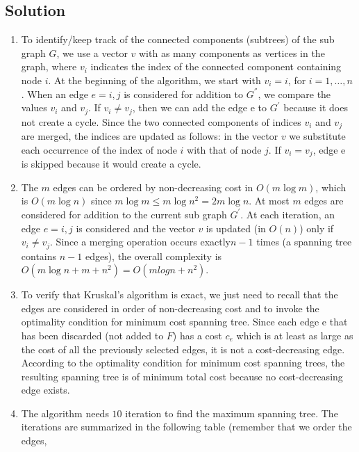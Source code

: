 \documentclass[12pt, a4paper]{report}
\newtheorem[style=M,bodystyle=\normalfont]{theorem}{Theorem}
\newtheorem[style=M,bodystyle=\normalfont]{corollary}{Corollary}
\newtheorem[style=M,bodystyle=\normalfont]{lemma}{Lemma}
\newtheorem[style=M,bodystyle=\normalfont]{definition}{Definition}
\begin{document}
    \subsection*{Solution}
        \begin{enumerate}
            \item To identify/keep track of the connected components (subtrees) of the sub graph $G$, we use a vector $v$ with as many components as vertices in the graph, 
                where $v_i$ indicates the index of the connected component containing node $i$. At the beginning of the algorithm, we start with $v_i=i$, for $i = 1,\dots,n$. 
                When an edge $e = {i,j}$ is considered for addition to $G^{''}$, we compare the values $v_i$ and $v_j$. If $v_i \neq v_j$, then we can add the edge e to $G^{'}$ 
                because it does not create a cycle. Since the two connected components of indices $v_i$ and $v_j$ are merged, the indices are updated as follows: in the vector $v$
                we substitute each occurrence of the index of node $i$ with that of node $j$. If $v_i = v_j$, edge e is skipped because it would create a cycle. 
            \item The $m$ edges can be ordered by non-decreasing cost in $O(m\log m)$, which is $O(m \log n)$ since $m\log m \leq m\log n^2 = 2m\log n$. At most $m$ edges are 
                considered for addition to the current sub graph $G^{'}$. At each iteration, an edge $e = {i,j}$ is considered and the vector $v$ is updated (in $O(n)$) only if 
                $v_i \neq v_j$. Since a merging operation occurs exactly$ n-1$ times (a spanning tree contains $n-1$ edges), the overall complexity is $O(m\log n + m+n^2)=
                O(mlogn + n^2)$. 
            \item To verify that Kruskal's algorithm is exact, we just need to recall that the edges are considered in order of non-decreasing cost and to invoke the 
                optimality condition for minimum cost spanning tree. Since each edge e that has been discarded (not added to $F$) has a cost $c_e$ which is at least as large as 
                the cost of all the previously selected edges, it is not a cost-decreasing edge. According to the optimality condition for minimum cost spanning trees, the 
                resulting spanning tree is of minimum total cost because no cost-decreasing edge exists. 
            \item The algorithm needs $10$ iteration to find the maximum spanning tree. The iterations are summarized in the following table (remember that we order the edges,

\end{enumerate}
\end{document}
